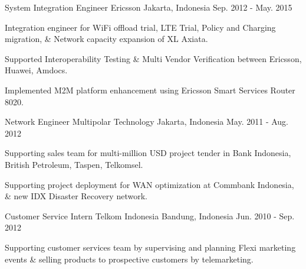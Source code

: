 \begin{cventries}
  \cventry
    {System Integration Engineer} %
    {Ericsson} %
    {Jakarta, Indonesia} %
    {Sep. 2012 - May. 2015} %
    {
      \begin{cvitems} %
        \item {Integration engineer for WiFi offload trial, LTE Trial, Policy and Charging migration, \& Network capacity expansion of XL Axiata.}
        \item {Supported Interoperability Testing \& Multi Vendor Verification between Ericsson, Huawei, Amdocs.}
        \item {Implemented M2M platform enhancement using Ericsson Smart Services Router 8020.}
      \end{cvitems}
    }

  \cventry
    {Network Engineer} %
    {Multipolar Technology} %
    {Jakarta, Indonesia} %
    {May. 2011 - Aug. 2012} %
    {
      \begin{cvitems} %
        \item {Supporting sales team for multi-million USD project tender in Bank Indonesia, British Petroleum, Taspen, Telkomsel.}
        \item {Supporting project deployment for WAN optimization at Commbank Indonesia, \& new IDX Disaster Recovery network.}
      \end{cvitems}
    }

  \cventry
    {Customer Service Intern} %
    {Telkom Indonesia} %
    {Bandung, Indonesia} %
    {Jun. 2010 - Sep. 2012} %
    {
      \begin{cvitems} %
        \item {Supporting customer services team by supervising and planning Flexi marketing events \& selling products to prospective customers by telemarketing.}
      \end{cvitems}
    }

\end{cventries}
